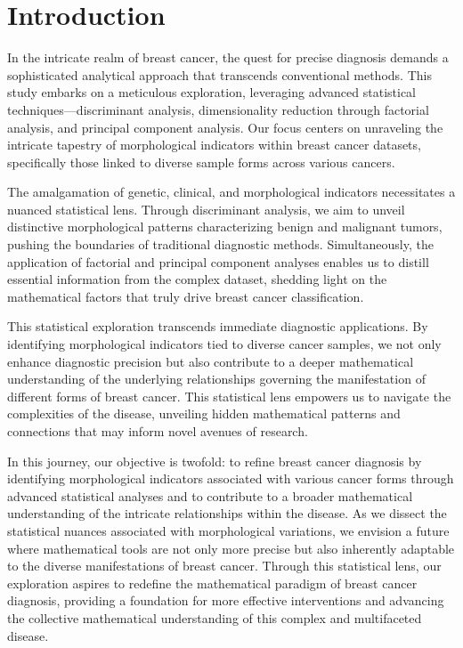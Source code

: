 \documentclass[10pt,a4paper]{article}
\theoremstyle{definition}
\theoremstyle{definition}
\begin{document}
\newpage

\section{Introduction}
In the intricate realm of breast cancer, the quest for precise diagnosis demands a sophisticated analytical approach that transcends conventional methods. This study embarks on a meticulous exploration, leveraging advanced statistical techniques—discriminant analysis, dimensionality reduction through factorial analysis, and principal component analysis. Our focus centers on unraveling the intricate tapestry of morphological indicators within breast cancer datasets, specifically those linked to diverse sample forms across various cancers.

The amalgamation of genetic, clinical, and morphological indicators necessitates a nuanced statistical lens. Through discriminant analysis, we aim to unveil distinctive morphological patterns characterizing benign and malignant tumors, pushing the boundaries of traditional diagnostic methods. Simultaneously, the application of factorial and principal component analyses enables us to distill essential information from the complex dataset, shedding light on the mathematical factors that truly drive breast cancer classification.

This statistical exploration transcends immediate diagnostic applications. By identifying morphological indicators tied to diverse cancer samples, we not only enhance diagnostic precision but also contribute to a deeper mathematical understanding of the underlying relationships governing the manifestation of different forms of breast cancer. This statistical lens empowers us to navigate the complexities of the disease, unveiling hidden mathematical patterns and connections that may inform novel avenues of research.

In this journey, our objective is twofold: to refine breast cancer diagnosis by identifying morphological indicators associated with various cancer forms through advanced statistical analyses and to contribute to a broader mathematical understanding of the intricate relationships within the disease. As we dissect the statistical nuances associated with morphological variations, we envision a future where mathematical tools are not only more precise but also inherently adaptable to the diverse manifestations of breast cancer. Through this statistical lens, our exploration aspires to redefine the mathematical paradigm of breast cancer diagnosis, providing a foundation for more effective interventions and advancing the collective mathematical understanding of this complex and multifaceted disease.
\end{document}
